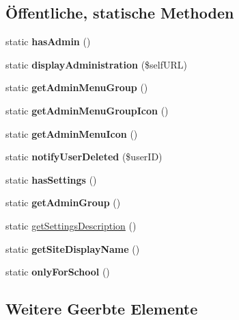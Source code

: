 \subsection*{Öffentliche, statische Methoden}
\begin{DoxyCompactItemize}
\item 
\mbox{\label{classmebis_af503bb668b4984b7bfbea316e20d022d}} 
static {\bfseries has\+Admin} ()
\item 
\mbox{\label{classmebis_af278f06519984e1fe7603fef72c6097f}} 
static {\bfseries display\+Administration} (\$self\+U\+RL)
\item 
\mbox{\label{classmebis_a5f753e327dd6e16cb51ac1a7b3fd3d1d}} 
static {\bfseries get\+Admin\+Menu\+Group} ()
\item 
\mbox{\label{classmebis_aa2c056b7b88ed906a6cf98af3fbd9f83}} 
static {\bfseries get\+Admin\+Menu\+Group\+Icon} ()
\item 
\mbox{\label{classmebis_a1cd24e6a62a1c63540fb5a2067f11f24}} 
static {\bfseries get\+Admin\+Menu\+Icon} ()
\item 
\mbox{\label{classmebis_af18e3a7e818d4dca00b36450d3f71a51}} 
static {\bfseries notify\+User\+Deleted} (\$user\+ID)
\item 
\mbox{\label{classmebis_a76ac205a4d082fb320612ab955447586}} 
static {\bfseries has\+Settings} ()
\item 
\mbox{\label{classmebis_aeab497eab637a06a51510d13a415b382}} 
static {\bfseries get\+Admin\+Group} ()
\item 
static \mbox{\hyperlink{classmebis_abbeca516ef6c8f23c74fe1f895f1db47}{get\+Settings\+Description}} ()
\item 
\mbox{\label{classmebis_a37ffec869e9521b292aa04553f33e14b}} 
static {\bfseries get\+Site\+Display\+Name} ()
\item 
\mbox{\label{classmebis_a759946891c7a2a6d2c7380231965e7f2}} 
static {\bfseries only\+For\+School} ()
\end{DoxyCompactItemize}
\subsection*{Weitere Geerbte Elemente}


